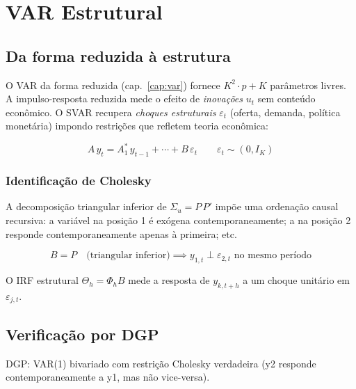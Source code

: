 \chapter{VAR Estrutural}
\label{cap:svar}

\section{Da forma reduzida à estrutura}

O VAR da forma reduzida (cap.~\ref{cap:var}) fornece $K^2 \cdot p + K$ parâmetros
livres. A impulso-resposta reduzida mede o efeito de \emph{inovações} $u_t$
sem conteúdo econômico. O SVAR recupera \emph{choques estruturais}
$\varepsilon_t$ (oferta, demanda, política monetária) impondo restrições
que refletem teoria econômica:

\[
  A\,y_t = A_1^*\,y_{t-1} + \cdots + B\,\varepsilon_t
  \qquad
  \varepsilon_t \sim (0, I_K)
\]

\subsection*{Identificação de Cholesky}

A decomposição triangular inferior de $\Sigma_u = P\,P'$ impõe uma
ordenação causal recursiva: a variável na posição 1 é exógena
contemporaneamente; a na posição 2 responde contemporaneamente apenas
à primeira; etc.

\[
  B = P \quad\text{(triangular inferior)} \implies y_{1,t} \perp \varepsilon_{2,t} \text{ no mesmo período}
\]

O IRF estrutural $\Theta_h = \Phi_h B$ mede a resposta de $y_{k,t+h}$
a um choque unitário em $\varepsilon_{j,t}$.

\section{Verificação por DGP}

DGP: VAR(1) bivariado com restrição Cholesky verdadeira (y2 responde
contemporaneamente a y1, mas não vice-versa).

